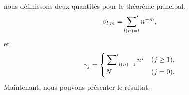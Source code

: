 nous d\'efinissons deux quantit\'es pour le th\'eor\`eme principal.
\begin{equation}
	\beta_{l, m} = \sideset{}{'}\sum_{l(n)=l}n^{-m},
	\label{eq:betaburnol}
\end{equation}
et
\begin{equation}
	\gamma_{j} = \begin{cases}
		\textstyle\sideset{}{'}\sum_{l(n)=1}n^{j} & (j\ge1), \\
		N & (j=0).
	\end{cases}
	\label{eq:gammaburnol}
\end{equation}
Maintenant, nous pouvons pr\'esenter le r\'esultat.
